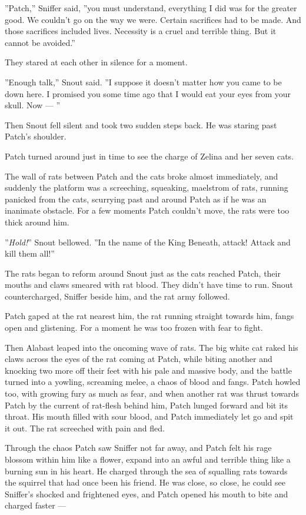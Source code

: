 \documentclass[12pt]{book}
\begin{document}
''Patch,'' Sniffer said, ''you must understand, everything I did was for the greater good. We couldn't go on the way we were. Certain sacrifices had to be made. And those sacrifices included lives. Necessity is a cruel and terrible thing. But it cannot be avoided.''

They stared at each other in silence for a moment.

''Enough talk,'' Snout said. ''I suppose it doesn't matter how you came to be down here. I promised you some time ago that I would eat your eyes from your skull. Now ---
''

Then Snout fell silent and took two sudden steps back. He was staring past Patch's shoulder.

Patch turned around just in time to see the charge of Zelina and her seven cats.

The wall of rats between Patch and the cats broke almost immediately, and suddenly the platform was a screeching, squeaking, maelstrom of rats, running panicked from the cats, scurrying past and around Patch as if he was an inanimate obstacle. For a few moments Patch couldn't move, the rats were too thick around him.

''{\it Hold!}'' Snout bellowed. ''In the name of the King Beneath, attack! Attack and kill them all!''

The rats began to reform around Snout just as the cats reached Patch, their mouths and claws smeared with rat blood. They didn't have time to run. Snout countercharged, Sniffer beside him, and the rat army followed.

Patch gaped at the rat nearest him, the rat running straight towards him, fangs open and glistening. For a moment he was too frozen with fear to fight.

Then Alabast leaped into the oncoming wave of rats. The big white cat raked his claws across the eyes of the rat coming at Patch, while biting another and knocking two more off their feet with his pale and massive body, and the battle turned into a yowling, screaming melee, a chaos of blood and fangs. Patch howled too, with growing fury as much as fear, and when another rat was thrust towards Patch by the current of rat-flesh behind him, Patch lunged forward and bit its throat. His mouth filled with sour blood, and Patch immediately let go and spit it out. The rat screeched with pain and fled.

Through the chaos Patch saw Sniffer not far away, and Patch felt his rage blossom within him like a flower, expand into an awful and terrible thing like a burning sun in his heart. He charged through the sea of squalling rats towards the squirrel that had once been his friend. He was close, so close, he could see Sniffer's shocked and frightened eyes, and Patch opened his mouth to bite and charged faster ---
\end{document}
